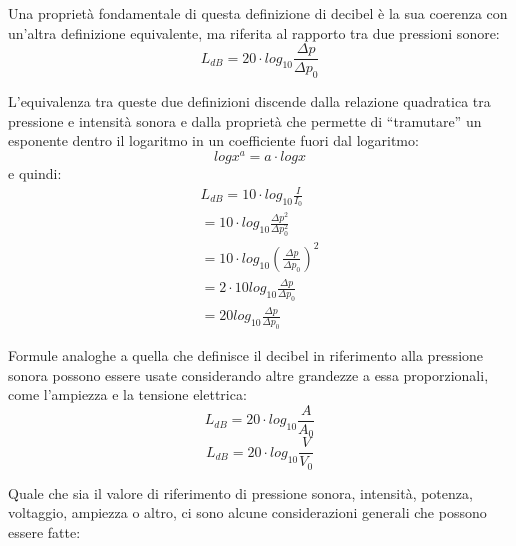 Una proprietà fondamentale di questa definizione di decibel è la sua coerenza con un'altra definizione equivalente, ma riferita al rapporto tra due pressioni sonore:
\begin{equation}
L_{dB} = 20 \cdot log_{10}\frac{\Delta p}{\Delta p_0}
\end{equation}

L'equivalenza tra queste due definizioni discende dalla relazione quadratica tra pressione e intensità sonora e dalla proprietà che permette di ``tramutare'' un esponente dentro il logaritmo in un coefficiente fuori dal logaritmo:
\begin{equation}
log x^a = a \cdot log x
\end{equation}
e quindi:
\begin{equation}
\begin{aligned}
L_{dB} = 10 \cdot log_{10}\frac{I}{I_0}\\
= 10 \cdot log_{10}\frac{\Delta p^2}{\Delta p_0^2}\\
= 10 \cdot log_{10}(\frac{\Delta p}{\Delta p_0})^2\\
= 2 \cdot 10 log_{10}\frac{\Delta p}{\Delta p_0}\\
= 20 log_{10}\frac{\Delta p}{\Delta p_0}
\end{aligned}
\end{equation}

Formule analoghe a quella che definisce il decibel in riferimento alla pressione sonora possono essere usate considerando altre grandezze a essa proporzionali, come l'ampiezza e la tensione elettrica:
\begin{equation}
L_{dB} = 20 \cdot log_{10}\frac{A}{A_0}
\end{equation}
\begin{equation}
L_{dB} = 20 \cdot log_{10}\frac{V}{V_0}
\end{equation}

Quale che sia il valore di riferimento di pressione sonora, intensità, potenza, voltaggio, ampiezza o altro, ci sono alcune considerazioni generali che possono essere fatte:

